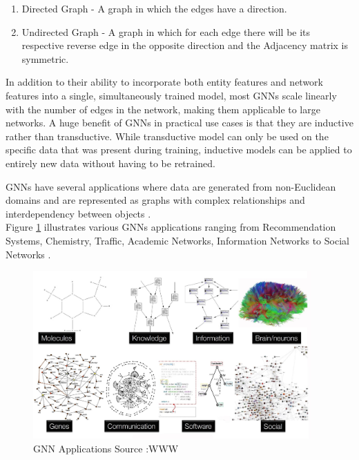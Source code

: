 \documentclass{report} %
\begin{document}
\begin{enumerate}
    \item Directed Graph - A graph in which the edges have a direction.
    \item Undirected Graph - A graph in which for each edge there will be its respective reverse edge in the opposite direction and the Adjacency matrix is symmetric.
\end{enumerate}

In addition to their ability to incorporate both entity features and network features into a single, simultaneously trained model, most GNNs scale linearly with the number of edges in the network, making them applicable to large
networks. A huge benefit of GNNs in practical use cases is that they are inductive rather than transductive. While transductive model can only be used on the specific data that was present during training, 
inductive models can be applied to entirely new data without having to be retrained. \cite{ML HGNN-2023}

\ac{GNN}s have several applications where data are generated from non-Euclidean domains and are represented as graphs with complex relationships and interdependency between objects \cite{GNN-2019}.\\
Figure \ref{fig:GNN Applications} illustrates various \ac{GNN}s applications ranging from Recommendation Systems, Chemistry, Traffic, Academic Networks, Information Networks to Social Networks \cite{HGNN-2020}.\\

\begin{figure}[H]
    \centering
    \includegraphics[width=0.95\textwidth]{./ReportImages/GraphApplications.png} 
    \caption{\ac{GNN} Applications Source :WWW}
    \label{fig:GNN Applications}
\end{figure}
\end{document}
